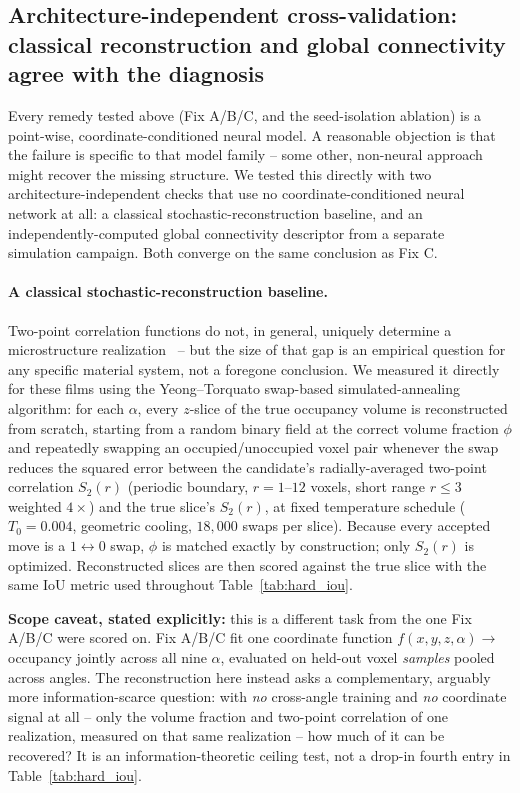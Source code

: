 \documentclass[aip,amsmath,amssymb,reprint]{revtex4-1}
\renewcommand{\ang}{\ensuremath{\alpha}} %
\begin{document}
\subsection{Architecture-independent cross-validation: classical reconstruction and global connectivity agree with the diagnosis}
\label{ssec:disc_crossval}

Every remedy tested above (Fix A/B/C, and the seed-isolation ablation) is a
point-wise, coordinate-conditioned neural model. A reasonable objection is
that the failure is specific to that model family -- some other, non-neural
approach might recover the missing structure. We tested this directly with
two architecture-independent checks that use no coordinate-conditioned neural
network at all: a classical stochastic-reconstruction baseline, and an
independently-computed global connectivity descriptor from a separate
simulation campaign. Both converge on the same conclusion as Fix C.

\paragraph{A classical stochastic-reconstruction baseline.}
Two-point correlation functions do not, in general, uniquely determine a
microstructure realization~\citep{yeong1998reconstructing} -- but the
size of that gap is an empirical question for any specific material system,
not a foregone conclusion. We measured it directly for these films using the
Yeong--Torquato swap-based simulated-annealing algorithm: for each
$\ang$, every $z$-slice of the true occupancy volume is reconstructed from
scratch, starting from a random binary field at the correct volume fraction
$\phi$ and repeatedly swapping an occupied/unoccupied voxel pair whenever the
swap reduces the squared error between the candidate's radially-averaged
two-point correlation $S_2(r)$ (periodic boundary, $r=1$--$12$ voxels, short
range $r\!\leq\!3$ weighted $4\times$) and the true slice's $S_2(r)$, at fixed
temperature schedule ($T_0=0.004$, geometric cooling, $18{,}000$ swaps per
slice). Because every accepted move is a $1\leftrightarrow0$ swap, $\phi$ is
matched exactly by construction; only $S_2(r)$ is optimized. Reconstructed
slices are then scored against the true slice with the same IoU metric used
throughout Table~\ref{tab:hard_iou}.

\textbf{Scope caveat, stated explicitly:} this is a different task from the
one Fix A/B/C were scored on. Fix A/B/C fit one coordinate function
$f(x,y,z,\ang)\!\to\!$occupancy jointly across all nine $\ang$, evaluated on
held-out voxel \emph{samples} pooled across angles. The reconstruction here
instead asks a complementary, arguably more information-scarce question: with
\emph{no} cross-angle training and \emph{no} coordinate signal at all -- only
the volume fraction and two-point correlation of one realization, measured
on that same realization -- how much of it can be recovered? It is an
information-theoretic ceiling test, not a drop-in fourth entry in
Table~\ref{tab:hard_iou}.
\end{document}
